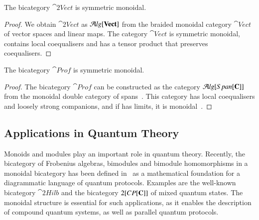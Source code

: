 \begin{cor}
The bicategory $\cat{2Vect}$ is symmetric monoidal.
\end{cor}

\begin{proof}
We obtain $\cat{2Vect}$ as $\mathcal{A}\mathit{lg}[\mathbf{Vect}]$ from the braided monoidal category $\cat{Vect}$ of vector spaces and linear maps. The category $\cat{Vect}$ is symmetric monoidal, contains local coequalisers and has a tensor product that preserves coequalisers. 
\end{proof}

\begin{cor}
The bicategory $\cat{Prof}$ is symmetric monoidal.
\end{cor}

\begin{proof}
The bicategory $\cat{Prof}$ can be constructed as the category $\mathcal{A}\mathit{lg}[Span[\mathbf{C}]]$ from the monoidal double category of spans~\cite[Examples 4.2]{shulman:frbi}.
This category has local coequalisers and loosely strong companions, and if  has limits, it is monoidal~\cite[Examples 4.15, 9.2]{shulman:frbi}.
\end{proof}

\subsection*{Applications in Quantum Theory}
Monoids and modules play an important role in quantum theory. Recently, the bicategory of Frobenius algebras, bimodules and bimodule homomorphisms in a monoidal bicategory has been defined in~\cite{heunenvicarywester} as a mathematical foundation for a diagrammatic language of quantum protocols. Examples are the well-known bicategory $\cat{2Hilb}$ and the bicategory $2[CP[{\bf C}]]$ of mixed quantum states. The monoidal structure is essential for such applications, as it enables the description of compound quantum systems, as well as parallel quantum protocols.

